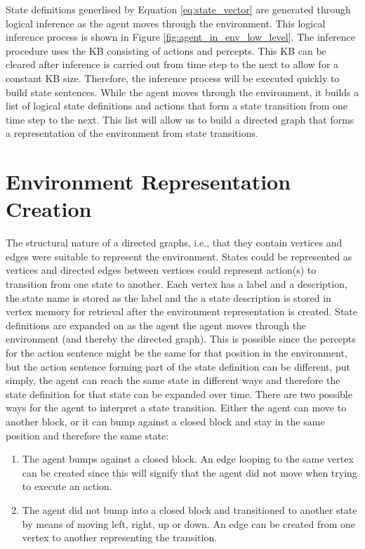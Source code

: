 State definitions generlised by Equation \ref{eq:state_vector} are generated through logical inference as the agent moves through the environment. This logical inference process is shown in Figure \ref{fig:agent_in_env_low_level}. The inference procedure uses the KB consisting of actions and percepts. This KB can be cleared after inference is carried out from time step to the next to allow for a constant KB size. Therefore, the inference process will be executed quickly to build state sentences. While the agent moves through the environment, it builds a list of logical state definitions and actions that form a state transition from one time step to the next. This list will allow us to build a directed graph that forms a representation of the environment from state transitions. 




\section{Environment Representation Creation}

The structural nature of a directed graphs, i.e., that they contain vertices and edges were suitable to represent the environment. States could be represented as vertices and directed edges between vertices could represent action(s) to transition from one state to another. Each vertex has a label and a description, the state name is stored as the label and the a state description is stored in vertex memory for retrieval after the environment representation is created. State definitions are expanded on as the agent the agent moves through the environment (and thereby the directed graph). This is possible since the percepts for the action sentence might be the same for that position in the environment, but the action sentence forming part of the state definition can be different, put simply, the agent can reach the same state in different ways and therefore the state definition for that state can be expanded over time. 
There are two possible ways for the agent to interpret a state transition. Either the agent can move to another block, or it can bump against a closed block and stay in the same position and therefore the same state:


\begin{enumerate}
	\item The agent bumps against a closed block. An edge looping to the same vertex can be created since this will signify that the agent did not move when trying to execute an action.
	\item The agent did not bump into a closed block and transitioned to another state by means of moving left, right, up or down. An edge can be created from one vertex to another representing the transition.
\end{enumerate}

